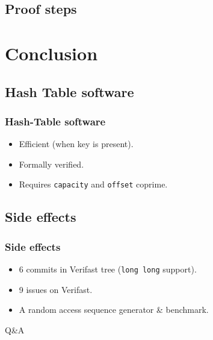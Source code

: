 \documentclass{beamer}
\begin{document}
\subsection{Proof steps}


\section{Conclusion}
\subsection{Hash Table software}
\begin{frame}
	\frametitle{Hash-Table software}
	\begin{itemize}
		\item Efficient (when key is present).
		\item Formally verified.
		\item Requires \texttt{capacity} and \texttt{offset} coprime.
	\end{itemize}
\end{frame}

\subsection{Side effects}
\begin{frame}
	\frametitle{Side effects}
	\begin{itemize}
		\item 6 commits in Verifast tree (\texttt{long long} support).
		\item 9 issues on Verifast.
		\item A random access sequence generator \& benchmark.
	\end{itemize}
\end{frame}



\begin{frame}
\begin{center}
\huge{Q\&A}
\end{center}
\end{frame}
\end{document}

